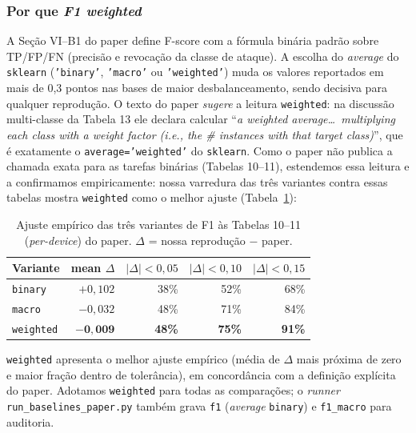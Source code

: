 \subsubsection{Por que \emph{F1 weighted}}
\label{sec:protocolo_metrica}

A Seção VI--B1 do paper define F-score com a fórmula binária padrão
sobre TP/FP/FN (precisão e revocação da classe de ataque). A escolha do
\emph{average} do \texttt{sklearn} (\texttt{'binary'}, \texttt{'macro'}
ou \texttt{'weighted'}) muda os valores reportados em mais de 0{,}3
pontos nas bases de maior desbalanceamento, sendo decisiva para qualquer
reprodução. O texto do paper \emph{sugere} a leitura \texttt{weighted}:
na discussão multi-classe da Tabela 13 ele declara calcular ``\emph{a
weighted average\ldots\ multiplying each class with a weight factor
(i.e., the \# instances with that target class)}'', que é exatamente o
\texttt{average='weighted'} do \texttt{sklearn}. Como o paper não publica
a chamada exata para as tarefas binárias (Tabelas 10--11), estendemos
essa leitura e a confirmamos empiricamente: nossa varredura das três
variantes contra essas tabelas mostra \texttt{weighted} como o melhor
ajuste (Tabela~\ref{tab:f1_metric}):

\begin{table}[ht]
  \centering
  \caption{Ajuste empírico das três variantes de F1 às Tabelas 10--11
           (\emph{per-device}) do paper. $\Delta$ = nossa reprodução $-$ paper.}
  \label{tab:f1_metric}
  \small
  \begin{tabular}{lrrrr}
    \toprule
    \textbf{Variante} & \textbf{mean $\Delta$} & \textbf{$|\Delta|<0{,}05$} & \textbf{$|\Delta|<0{,}10$} & \textbf{$|\Delta|<0{,}15$} \\
    \midrule
    \texttt{binary}   & $+0{,}102$ & 38\% & 52\% & 68\% \\
    \texttt{macro}    & $-0{,}032$ & 48\% & 71\% & 84\% \\
    \texttt{weighted} & $\mathbf{-0{,}009}$ & \textbf{48\%} & \textbf{75\%} & \textbf{91\%} \\
    \bottomrule
  \end{tabular}
\end{table}

\texttt{weighted} apresenta o melhor ajuste empírico (média de $\Delta$ mais
próxima de zero e maior fração dentro de tolerância), em concordância
com a definição explícita do paper. Adotamos \texttt{weighted} para
todas as comparações; o \emph{runner} \texttt{run\_baselines\_paper.py}
também grava \texttt{f1} (\emph{average} \texttt{binary}) e \texttt{f1\_macro} para auditoria.

